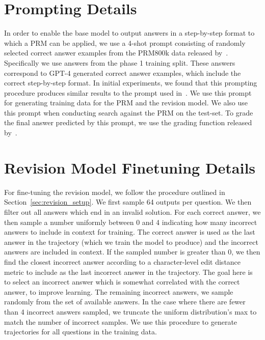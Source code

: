 \documentclass[11pt, letterpaper, logo]{googledeepmind}
\begin{document}
\section{Prompting Details}
\label{app:prompting}

In order to enable the base model to output answers in a step-by-step format to which a PRM can be applied, we use a 4-shot prompt consisting of randomly selected correct answer examples from the PRM800k data released by~\citet{lightman2023lets}. Specifically we use answers from the phase 1 training split. These answers correspond to GPT-4 generated correct answer examples, which include the correct step-by-step format. In initial experiments, we found that this prompting procedure produces similar results to the prompt used in~\citet{lewkowycz2022solving}. We use this prompt for generating training data for the PRM and the revision model. We also use this prompt when conducting search against the PRM on the test-set. To grade the final answer predicted by this prompt, we use the grading function released by~\citet{lightman2023lets}.

\section{Revision Model Finetuning Details}
\label{app:revision_finetune}

For fine-tuning the revision model, we follow the procedure outlined in Section~\ref{sec:revision_setup}. We first sample 64 outputs per question. We then filter out all answers which end in an invalid solution. For each correct answer, we then sample a number uniformly between 0 and 4 indicating how many incorrect answers to include in context for training. The correct answer is used as the last answer in the trajectory (which we train the model to produce) and the incorrect answers are included in context. If the sampled number is greater than 0, we then find the closest incorrect answer according to a character-level edit distance metric to include as the last incorrect answer in the trajectory. The goal here is to select an incorrect answer which is somewhat correlated with the correct answer, to improve learning. The remaining incorrect answers, we sample randomly from the set of available answers. In the case where there are fewer than 4 incorrect answers sampled, we truncate the uniform distribution's max to match the number of incorrect samples. We use this procedure to generate trajectories for all questions in the training data.
\end{document}
